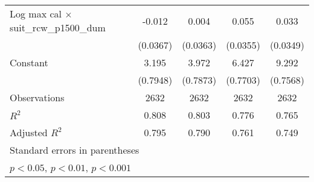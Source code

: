 {\begin{tabular}{l*{4}{c}}
\addlinespace
Log max cal $\times$ suit\_rcw\_p1500\_dum&      -0.012         &       0.004         &       0.055         &       0.033         \\
                    &    (0.0367)         &    (0.0363)         &    (0.0355)         &    (0.0349)         \\
\addlinespace
Constant            &       3.195\sym{***}&       3.972\sym{***}&       6.427\sym{***}&       9.292\sym{***}\\
                    &    (0.7948)         &    (0.7873)         &    (0.7703)         &    (0.7568)         \\
\midrule
Observations        &        2632         &        2632         &        2632         &        2632         \\
\(R^{2}\)           &       0.808         &       0.803         &       0.776         &       0.765         \\
Adjusted \(R^{2}\)  &       0.795         &       0.790         &       0.761         &       0.749         \\
\bottomrule
\multicolumn{5}{l}{\footnotesize Standard errors in parentheses}\\
\multicolumn{5}{l}{\footnotesize \sym{*} \(p<0.05\), \sym{**} \(p<0.01\), \sym{***} \(p<0.001\)}\\
\end{tabular}
}

